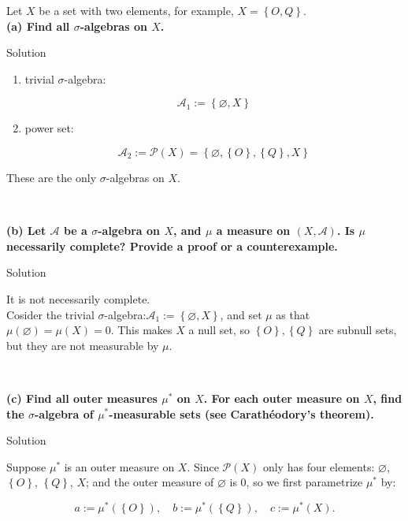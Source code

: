 \documentclass{qlnotes-export}
\begin{document}
Let \(X\) be a set with two elements, for example, \(X = \left\{ {O,Q} \right\}\).\\
\textbf{(a) Find all \(\sigma\)-algebras on \(X\).}

\begin{qlsolution}{Solution}

\begin{enumerate}
\item
  trivial \(\sigma\)-algebra:

  \[\mathcal{A}_{1} := \left\{ {\varnothing, X} \right\}\]
\item
  power set:

  \[\mathcal{A}_{2} := \mathcal{P}(X) = \left\{ {\varnothing,\left\{ O \right\},\left\{ Q \right\}, X} \right\}\]
\end{enumerate}

These are the only \(\sigma\)-algebras on \(X\).\\
\strut \\

\end{qlsolution}

\textbf{(b) Let \(\mathcal{A}\) be a \(\sigma\)-algebra on \(X\), and \(\mu\) a measure on \((X,\mathcal{A})\). Is \(\mu\) necessarily complete? Provide a proof or a counterexample.}

\begin{qlsolution}{Solution}

It is not necessarily complete.\\
Cosider the trivial \(\sigma\)-algebra:\(\mathcal{A}_{1} := \left\{ {\varnothing, X} \right\}\), and set \(\mu\) as that \(\mu(\varnothing) = \mu(X) = 0\). This makes \(X\) a null set, so \(\left\{ O \right\},\left\{ Q \right\}\) are subnull sets, but they are not measurable by \(\mu\).\\
\strut \\

\end{qlsolution}

\textbf{(c) Find all outer measures \(\mu^{\ast}\) on \(X\). For each outer measure on \(X\), find the \(\sigma\)-algebra of \(\mu^{\ast}\)-measurable sets (see Carathéodory's theorem).}

\begin{qlsolution}{Solution}

Suppose \(\mu^{\ast}\) is an outer measure on \(X\). Since \(\mathcal{P}(X)\) only has four elements: \(\varnothing\), \(\left\{ O \right\}\), \(\left\{ Q \right\}\), \(X\); and the outer measure of \(\varnothing\) is 0, so we first parametrize \(\mu^{\ast}\) by:

\[a := \mu^{\ast}(\left\{ O \right\}),\quad b := \mu^{\ast}(\left\{ Q \right\}),\quad c := \mu^{\ast}(X).\]

\end{qlsolution}
\end{document}
